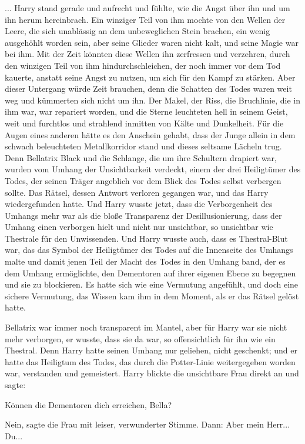 ... Harry stand gerade und aufrecht und fühlte, wie die Angst über ihn und um
ihn herum hereinbrach. Ein winziger Teil von ihm mochte von den Wellen der
Leere, die sich unablässig an dem unbeweglichen Stein brachen, ein wenig
ausgehöhlt worden sein, aber seine Glieder waren nicht kalt, und seine Magie war
bei ihm. Mit der Zeit könnten diese Wellen ihn zerfressen und verzehren, durch
den winzigen Teil von ihm hindurchschleichen, der noch immer vor dem Tod
kauerte, anstatt seine Angst zu nutzen, um sich für den Kampf zu stärken. Aber
dieser Untergang würde Zeit brauchen, denn die Schatten des Todes waren weit weg
und kümmerten sich nicht um ihn. Der Makel, der Riss, die Bruchlinie, die in ihm
war, war repariert worden, und die Sterne leuchteten hell in seinem Geist, weit
und furchtlos und strahlend inmitten von Kälte und Dunkelheit. Für die Augen
eines anderen hätte es den Anschein gehabt, dass der Junge allein in dem schwach
beleuchteten Metallkorridor stand und dieses seltsame Lächeln trug. Denn
Bellatrix Black und die Schlange, die um ihre Schultern drapiert war, wurden vom
Umhang der Unsichtbarkeit verdeckt, einem der drei Heiligtümer des Todes, der
seinen Träger angeblich vor dem Blick des Todes selbst verbergen sollte. Das
Rätsel, dessen Antwort verloren gegangen war, und das Harry wiedergefunden
hatte. Und Harry wusste jetzt, dass die Verborgenheit des Umhangs mehr war als
die bloße Transparenz der Desillusionierung, dass der Umhang einen verborgen
hielt und nicht nur unsichtbar, so unsichtbar wie Thestrale für den Unwissenden.
Und Harry wusste auch, dass es Thestral-Blut war, das das Symbol der Heiligtümer
des Todes auf die Innenseite des Umhangs malte und damit jenen Teil der Macht
des Todes in den Umhang band, der es dem Umhang ermöglichte, den Dementoren auf
ihrer eigenen Ebene zu begegnen und sie zu blockieren. Es hatte sich wie eine
Vermutung angefühlt, und doch eine sichere Vermutung, das Wissen kam ihm in dem
Moment, als er das Rätsel gelöst hatte.

Bellatrix war immer noch transparent im Mantel, aber für Harry war sie nicht
mehr verborgen, er wusste, dass sie da war, so offensichtlich für ihn wie ein
Thestral. Denn Harry hatte seinen Umhang nur geliehen, nicht geschenkt; und er
hatte das Heiligtum des Todes, das durch die Potter-Linie weitergegeben worden
war, verstanden und gemeistert. Harry blickte die unsichtbare Frau direkt an und
sagte:

\glqq{}Können die Dementoren dich erreichen, Bella?\grqq{}

\glqq{}Nein\grqq{}, sagte die Frau mit leiser, verwunderter Stimme. Dann: \glqq{}
Aber mein Herr... Du...\grqq{}

